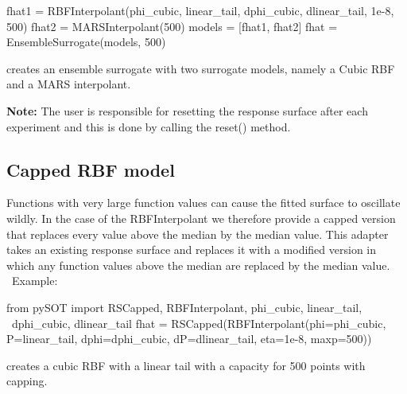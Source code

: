 \documentclass[]{article}
\begin{document}
\begin{itemize}
\begin{python}
fhat1 = RBFInterpolant(phi_cubic, linear_tail,
                       dphi_cubic, dlinear_tail, 1e-8, 500)
fhat2 = MARSInterpolant(500)
models = [fhat1, fhat2]
fhat = EnsembleSurrogate(models, 500)
\end{python}
creates an ensemble surrogate with two surrogate models, namely a Cubic RBF and a MARS interpolant.
\end{itemize}
\textbf{Note:} The user is responsible for resetting the response surface after each experiment and this is done by calling the reset() method.

\subsection{Capped RBF model} Functions with very large function values can cause the fitted surface to oscillate wildly. In the case of the RBFInterpolant we therefore provide a capped version that replaces every value above the median by the median value. This adapter takes an existing response surface and replaces it with a modified version in which any function values above the median are replaced by the median value. \\
\ \newline Example: 
\begin{python}
from pySOT import RSCapped, RBFInterpolant, phi_cubic, linear_tail, \
	          dphi_cubic, dlinear_tail
fhat = RSCapped(RBFInterpolant(phi=phi_cubic, P=linear_tail, dphi=dphi_cubic, 
                               dP=dlinear_tail, eta=1e-8, maxp=500))
\end{python}
creates a cubic RBF with a linear tail with a capacity for 500 points with capping.
\end{document}
